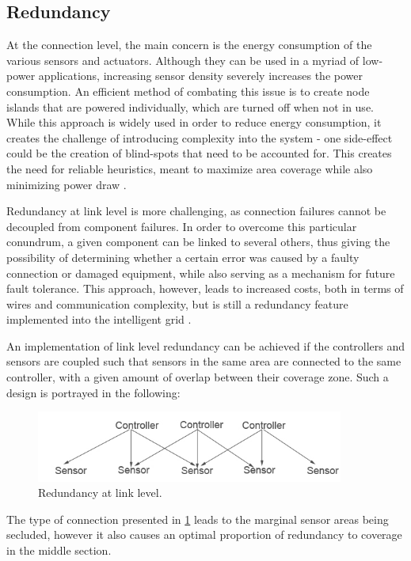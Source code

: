 \documentclass[12pt, english, a4paper]{report}
\begin{document}
\subsection{Redundancy}

At the connection level, the main concern is the energy consumption of the various sensors and actuators. Although they can be used in a 
myriad of low-power applications, increasing sensor density severely increases the power consumption. An efficient method of combating this 
issue is to create node islands that are powered individually, which are turned off when not in use. While this approach is widely used in 
order to reduce energy consumption, it creates the challenge of introducing complexity into the system - one side-effect could be the creation 
of blind-spots that need to be accounted for. This creates the need for reliable heuristics, meant to maximize area coverage while also 
minimizing power draw \cite{4}.

Redundancy at link level is more challenging, as connection failures cannot be decoupled from component failures. In order to overcome this
particular conundrum, a given component can be linked to several others, thus giving the possibility of determining whether a certain
error was caused by a faulty connection or damaged equipment, while also serving as a mechanism for future fault tolerance. This approach,
however, leads to increased costs, both in terms of wires and communication complexity, but is still a redundancy feature implemented into
the intelligent grid \cite{46}.

An implementation of link level redundancy can be achieved if the controllers and sensors are coupled such that sensors in the same area
are connected to the same controller, with a given amount of overlap between their coverage zone.  Such a design is portrayed in the following:

\begin{figure}[H]
	\includegraphics[width=0.9\textwidth, height=0.20\textwidth]{Pic6}
    \caption{Redundancy at link level. \cite{88} \label{fig:redundancy}}
\end{figure}

The type of connection presented in \cref{fig:redundancy} leads to the marginal sensor areas being secluded, however it also causes an 
optimal proportion of redundancy to coverage in the middle section.
\end{document}
